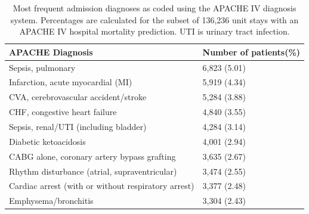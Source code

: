 \documentclass[english]{article}
\begin{document}
\begin{center}
\begin{table}
\begin{tabular}{l|p{4cm}}
  APACHE Diagnosis & Number of patients(\%) \\\hline
Sepsis, pulmonary                                  &  6,823 (5.01) \\
Infarction, acute myocardial (MI)                  &  5,919 (4.34) \\
CVA, cerebrovascular accident/stroke               &  5,284 (3.88) \\
CHF, congestive heart failure                      &  4,840 (3.55) \\
Sepsis, renal/UTI (including bladder)              &  4,284 (3.14) \\
Diabetic ketoacidosis                              &  4,001 (2.94) \\
CABG alone, coronary artery bypass grafting        &  3,635 (2.67) \\
Rhythm disturbance (atrial, supraventricular)      &  3,474 (2.55) \\
Cardiac arrest (with or without respiratory arrest) &  3,377 (2.48) \\
Emphysema/bronchitis                               &  3,304 (2.43) \\
\hline
\end{tabular}
\caption{Most frequent admission diagnoses as coded using the APACHE IV
diagnosis system. Percentages are calculated for the subset of 136,236 unit
stays with an APACHE IV hospital mortality prediction. UTI is urinary tract infection.
\label{tab:apachedx}}
\end{table}
\end{center}

\end{document}
